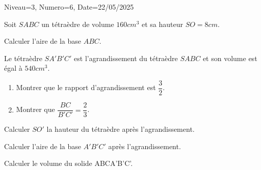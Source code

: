 \documentclass[12pt]{article}
\begin{document}
\begin{Maquette}[DS]{Niveau=3, Numero=6, Date=22/05/2025}
\begin{exercice}[BaremeDetaille=true]
Soit $SABC$  un tétraèdre de volume $160 cm^3$ et sa hauteur $SO=8cm$.
\begin{enumerate}
\begin{minipage}{.65\linewidth}
\item{} Calculer l'aire de la base $ABC$.\\\anserline[3]
\item  Le tétraèdre $SA'B'C'$ est l'agrandissement du tétraèdre $SABC$ et son volume est égal à $540 cm^3$.
\end{minipage}%
\begin{minipage}{.35\linewidth}
\end{minipage}%
\begin{enumerate}
\item {} Montrer que le rapport d'agrandissement est $\dfrac{3}{2}$.\\\anserline[3]
\item{} Montrer que $\dfrac{BC}{B'C'}=\dfrac{2}{3}$.\\\anserline[3]
\end{enumerate}
\item{} Calculer $SO'$ la hauteur du tétraèdre après l'agrandissement.\\\anserline[3]
\item{} Calculer l'aire de la base $A'B'C'$ après l'agrandissement.\\\anserline[3]
\item{} Calculer le volume du solide ABCA'B'C'.\par\anserline[3]
\end{enumerate}
\end{exercice}

\end{Maquette}
\end{document}
